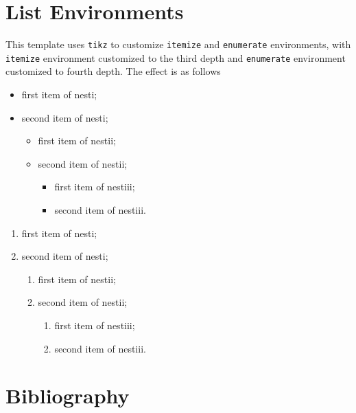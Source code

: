 \documentclass[fancy,blue,11pt]{elegantbook}
\begin{document}
\section{List Environments}
This template uses \lstinline{tikz} to customize \lstinline{itemize} and \lstinline{enumerate} environments, with  \lstinline{itemize} environment customized to the third depth and \lstinline{enumerate} environment customized to fourth depth. The effect is as follows\\[2ex]
\begin{minipage}[b]{0.49\textwidth}
\begin{itemize}
   \item first item of nesti;
   \item second item of nesti;
   \begin{itemize}
      \item first item of nestii;
      \item second item of nestii;
      \begin{itemize}
         \item first item of nestiii;
         \item second item of nestiii.
      \end{itemize}   
   \end{itemize}
\end{itemize}
\end{minipage}
\begin{minipage}[b]{0.49\textwidth}
\begin{enumerate}
   \item first item of nesti;
   \item second item of nesti;
   \begin{enumerate}
      \item first item of nestii;
      \item second item of nestii;
      \begin{enumerate}
         \item first item of nestiii;
         \item second item of nestiii.
      \end{enumerate}   
   \end{enumerate}
\end{enumerate}
\end{minipage}

\section{Bibliography}
\end{document}
